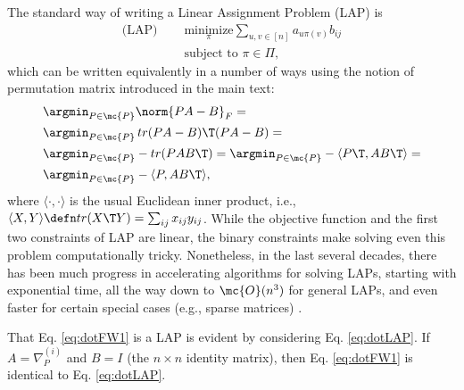 \documentclass[10pt,journal,cspaper,compsoc]{IEEEtran}
\newcommand{\PmcP}{P \in \mc{P}}
\begin{document}

The standard way of writing a Linear Assignment Problem (LAP) is
\begin{subequations} \label{eq:LAP}
\begin{align}
	 \text{(LAP) }\quad  &\underset{\pi}{\text{minimize}} \sum_{u,v \in [n]} a_{u \pi(v)} b_{ij} \\
	&\text{subject to } \pi \in \Pi,
\end{align}
\end{subequations}
which can be written equivalently in a number of ways using the notion of permutation matrix introduced in the main text:
\begin{subequations} \label{eq:LAP2}
\begin{align}
	&\argmin_{\PmcP} \norm{PA - B}_F =\\
	&\argmin_{\PmcP} \, tr(PA-B)\T (PA-B)=\\ 
	&\argmin_{\PmcP}  -tr (P AB\T) = \argmin_{\PmcP}  -\langle P\T, AB\T \rangle = \label{eq:2c} \\
	&\argmin_{\PmcP}  -\langle P, AB\T \rangle, \label{eq:dotLAP}
\end{align}
\end{subequations}
where $\langle \cdot,\cdot \rangle$ %
is the usual Euclidean inner product, i.e., $\langle X,Y\rangle \defn tr(X\T Y)= \sum_{ij} x_{ij} y_{ij}$.
While the objective function and the first two constraints of LAP are linear, the binary constraints make solving even this problem computationally tricky.  Nonetheless, in the last several decades, there has been much progress in accelerating algorithms for solving LAPs, starting with exponential time, all the way down to $\mc{O}(n^3)$ for general LAPs, and even faster for certain special cases (e.g., sparse matrices) \cite{Jonker1987, Burkard2009}.

That Eq. \eqref{eq:dotFW1} is a LAP is evident by considering Eq. \eqref{eq:dotLAP}.  If $A=\nabla_P^{(i)}$ and $B=I$ (the $n\times n$ identity matrix), then Eq. \eqref{eq:dotFW1} is identical to Eq. \eqref{eq:dotLAP}.
\end{document}
